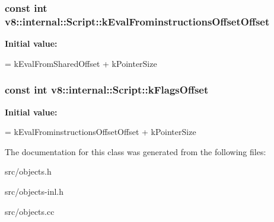 \subsubsection[{k\+Eval\+Frominstructions\+Offset\+Offset}]{\setlength{\rightskip}{0pt plus 5cm}const int v8\+::internal\+::\+Script\+::k\+Eval\+Frominstructions\+Offset\+Offset\hspace{0.3cm}{\ttfamily [static]}}\label{classv8_1_1internal_1_1_script_a5c7eecae36ba89633e7a9854a7f79629}
{\bfseries Initial value\+:}
\begin{DoxyCode}
=
      kEvalFromSharedOffset + kPointerSize
\end{DoxyCode}
\hypertarget{classv8_1_1internal_1_1_script_a885bc782f8dc8c358d4aae4a72b97e9b}{}
\subsubsection[{k\+Flags\+Offset}]{\setlength{\rightskip}{0pt plus 5cm}const int v8\+::internal\+::\+Script\+::k\+Flags\+Offset\hspace{0.3cm}{\ttfamily [static]}}\label{classv8_1_1internal_1_1_script_a885bc782f8dc8c358d4aae4a72b97e9b}
{\bfseries Initial value\+:}
\begin{DoxyCode}
=
      kEvalFrominstructionsOffsetOffset + kPointerSize
\end{DoxyCode}


The documentation for this class was generated from the following files\+:\begin{DoxyCompactItemize}
\item 
src/objects.\+h\item 
src/objects-\/inl.\+h\item 
src/objects.\+cc\end{DoxyCompactItemize}
